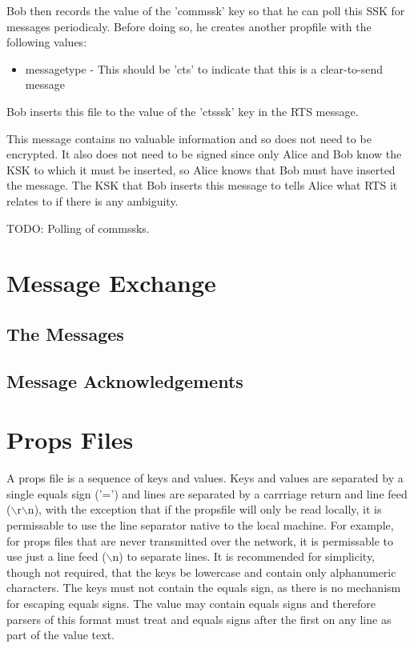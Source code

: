\documentclass[12pt,a4paper]{article}
\begin{document}
Bob then records the value of the 'commssk' key so that he can poll this SSK for messages periodicaly. Before doing so, he creates another propfile with the following values:

\begin{itemize}
\item messagetype - This should be 'cts' to indicate that this is a clear-to-send message
\end{itemize}

Bob inserts this file to the value of the 'ctsssk' key in the RTS message.

This message contains no valuable information and so does not need to be encrypted. It also does not need to be signed since only Alice and Bob know the KSK to which it must be inserted, so Alice knows that Bob must have inserted the message. The KSK that Bob inserts this message to tells Alice what RTS it relates to if there is any ambiguity.

TODO: Polling of commssks.

\section{Message Exchange}
\subsection{The Messages}

\subsection{Message Acknowledgements}

\appendix

\section{Props Files}
\label{PropsFile}
A props file is a sequence of keys and values. Keys and values are separated by a single equals sign ('=') and lines are separated by a carrriage return and line feed ($\backslash$r$\backslash$n), with the exception that if the propsfile will only be read locally, it is permissable to use the line separator native to the local machine. For example, for props files that are never transmitted over the network, it is permissable to use just a line feed ($\backslash$n) to separate lines. It is recommended for simplicity, though not required, that the keys be lowercase and contain only alphanumeric characters. The keys must not contain the equals sign, as there is no mechanism for escaping equals signs. The value may contain equals signs and therefore parsers of this format must treat and equals signs after the first on any line as part of the value text.
\end{document}
